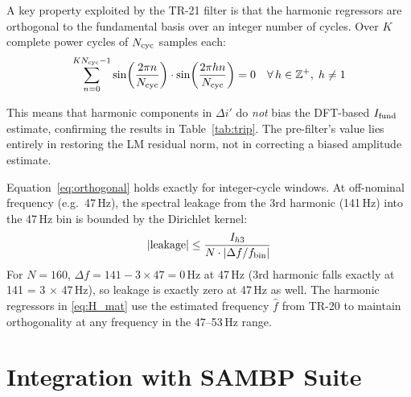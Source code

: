 \documentclass[11pt, a4paper]{article}
\begin{document}
A key property exploited by the TR-21 filter is that the harmonic regressors
are orthogonal to the fundamental basis over an integer number of cycles.
Over $K$ complete power cycles of $N_{\rm cyc}$ samples each:
\begin{equation}
  \sum_{n=0}^{KN_{\rm cyc}-1} \sin\!\left(\frac{2\pi n}{N_{\rm cyc}}\right)
  \cdot \sin\!\left(\frac{2\pi h n}{N_{\rm cyc}}\right) = 0
  \quad \forall\, h \in \mathbb{Z}^+,\; h \neq 1
  \label{eq:orthogonal}
\end{equation}

This means that harmonic components in $\Delta i'$ do \emph{not} bias the
DFT-based $I_{\rm fund}$ estimate, confirming the results in Table~\ref{tab:trip}.
The pre-filter's value lies entirely in restoring the LM residual norm, not
in correcting a biased amplitude estimate.

Equation~\eqref{eq:orthogonal} holds exactly for integer-cycle windows.
At off-nominal frequency (e.g.\ 47\,Hz), the spectral leakage from the 3rd
harmonic (141\,Hz) into the 47\,Hz bin is bounded by the Dirichlet kernel:
\begin{equation}
  |\mathrm{leakage}| \leq \frac{I_{h3}}{N \cdot |\Delta f / f_{\rm bin}|}
\end{equation}
For $N = 160$, $\Delta f = 141 - 3 \times 47 = 0$\,Hz at 47\,Hz
(3rd harmonic falls exactly at 141 = 3 × 47\,Hz), so leakage is exactly
zero at 47\,Hz as well.  The harmonic regressors in \eqref{eq:H_mat} use
the estimated frequency $\hat{f}$ from TR-20 to maintain orthogonality at
any frequency in the 47--53\,Hz range.


\section{Integration with SAMBP Suite}
\label{sec:integration}
\end{document}
